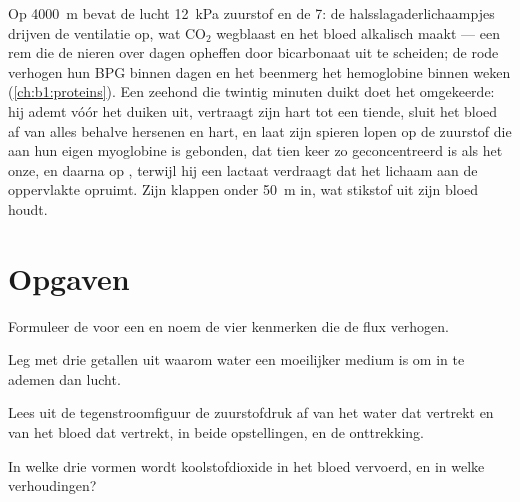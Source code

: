 \begin{example}\label{ex:b1:gas-exchange:altitudediving}
Op \qty{4000}{m} bevat de lucht \qty{12}{kPa} zuurstof en de 
\qty{7}{}: de halsslagaderlichaampjes drijven de ventilatie op, wat $\mathrm{CO_2}$
wegblaast en het bloed alkalisch maakt --- een rem die de nieren over dagen
opheffen door bicarbonaat uit te scheiden; de rode  verhogen hun BPG binnen
dagen en het beenmerg het hemoglobine binnen weken (\cref{ch:b1:proteins}). Een
zeehond die twintig minuten duikt doet het omgekeerde: hij ademt vóór het duiken
uit, vertraagt zijn hart tot een tiende, sluit het bloed af van alles behalve
hersenen en hart, en laat zijn spieren lopen op de zuurstof die aan hun eigen
myoglobine is gebonden, dat tien keer zo geconcentreerd is als het onze, en daarna
op , terwijl hij een lactaat verdraagt dat het lichaam aan de oppervlakte
opruimt. Zijn  klappen onder \qty{50}{m} in, wat stikstof uit zijn bloed
houdt.
\end{example}

\section{Opgaven}

\begin{exercise}[$\star$]\label{exo:b1:gas-exchange:1}
Formuleer de  voor een  en noem de vier kenmerken
die de flux verhogen.
\end{exercise}

\begin{exercise}[$\star$]\label{exo:b1:gas-exchange:2}
Leg met drie getallen uit waarom water een moeilijker medium is om in te ademen dan
lucht.
\end{exercise}

\begin{exercise}[$\star$]\label{exo:b1:gas-exchange:3}
Lees uit de tegenstroomfiguur de zuurstofdruk af van het water dat vertrekt en van
het bloed dat vertrekt, in beide opstellingen, en de onttrekking.
\end{exercise}

\begin{exercise}[$\star$]\label{exo:b1:gas-exchange:4}
In welke drie vormen wordt koolstofdioxide in het bloed vervoerd, en in welke
verhoudingen?
\end{exercise}

